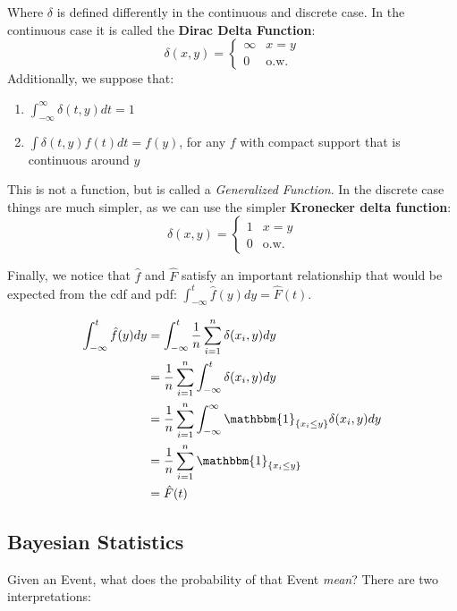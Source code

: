 \documentclass[]{article}
\theoremstyle{mattstyle}
\theoremstyle{definition}
\begin{document}
Where $\delta$ is defined differently in the continuous and discrete case. In the continuous case it is called the \textbf{Dirac Delta Function}:
	\begin{equation}
		\delta(x,y) = \begin{cases}
		\infty & x=y \\
		0 & \text{o.w.}
	\end{cases}
	\end{equation}
	Additionally, we suppose that:
	\begin{enumerate}
		\item $\int_{-\infty}^{\infty} \delta(t,y)dt = 1$
		\item $\int \delta(t,y) f(t) dt = f(y)$, for any $f$ with compact support that is continuous around $y$
	\end{enumerate}

This is not a function, but is called a \emph{Generalized Function}. In the discrete case things are much simpler, as we can use the simpler \textbf{Kronecker delta function}:
\begin{equation}
	\delta(x,y) = 
	\begin{cases}
		1 & x=y \\
		0 & \text{o.w.}
	\end{cases}
\end{equation}

Finally, we notice that $\hat{f}$ and $\hat{F}$ satisfy an important relationship that would be expected from the cdf and pdf: $\int_{-\infty}^{t}\hat{f}(y)dy = \hat{F}(t)$.

\begin{align*}
\int_{-\infty}^{t}\hat{f}(y)dy &= \int_{-\infty}^{t} \frac{1}{n}\sum_{i=1}^n \delta(x_i, y)dy\\
&= \frac{1}{n}\sum_{i=1}^n \int_{-\infty}^{t}  \delta(x_i, y)dy\\
&= \frac{1}{n}\sum_{i=1}^n \int_{-\infty}^{\infty} \mathbbm{1}_{\{x_i \le y\}} \delta(x_i, y)dy\\
&= \frac{1}{n}\sum_{i=1}^n \mathbbm{1}_{\{x_i \le y\}}\\
&= \hat{F}(t)
\end{align*}

\newpage
\subsection{Bayesian Statistics}

Given an Event, what does the probability of that Event \emph{mean}? There are two interpretations:
\end{document}
